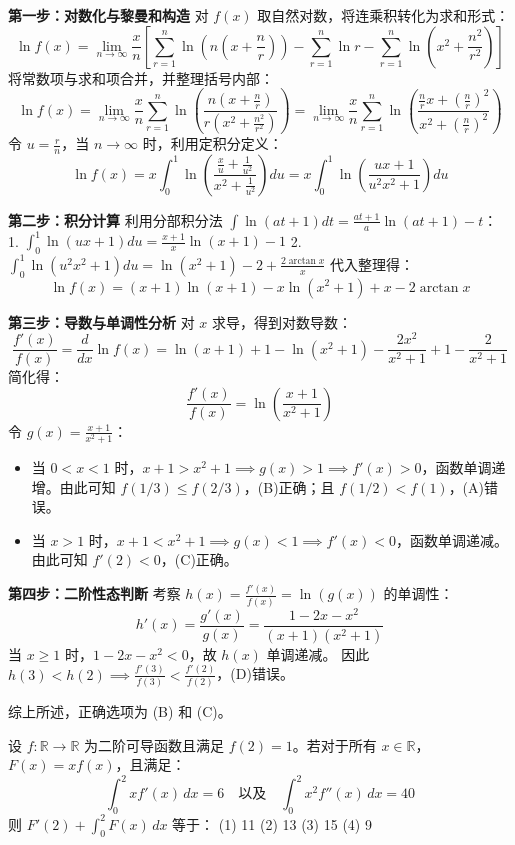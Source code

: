 \begin{questions}
\begin{solution}
\textbf{第一步：对数化与黎曼和构造}
对 $f(x)$ 取自然对数，将连乘积转化为求和形式：
\[ \ln f(x) = \lim_{n \to \infty} \frac{x}{n} \left[ \sum_{r=1}^{n} \ln\left(n\left(x+\frac{n}{r}\right)\right) - \sum_{r=1}^{n} \ln r - \sum_{r=1}^{n} \ln\left(x^2+\frac{n^2}{r^2}\right) \right] \]
将常数项与求和项合并，并整理括号内部：
\[ \ln f(x) = \lim_{n \to \infty} \frac{x}{n} \sum_{r=1}^{n} \ln \left( \frac{n(x + \frac{n}{r})}{r(x^2 + \frac{n^2}{r^2})} \right) = \lim_{n \to \infty} \frac{x}{n} \sum_{r=1}^{n} \ln \left( \frac{\frac{n}{r}x + (\frac{n}{r})^2}{x^2 + (\frac{n}{r})^2} \right) \]
令 $u = \frac{r}{n}$，当 $n \to \infty$ 时，利用定积分定义：
\[ \ln f(x) = x \int_{0}^{1} \ln \left( \frac{\frac{x}{u} + \frac{1}{u^2}}{x^2 + \frac{1}{u^2}} \right) du = x \int_{0}^{1} \ln \left( \frac{ux+1}{u^2x^2+1} \right) du \]

\textbf{第二步：积分计算}
利用分部积分法 $\int \ln(at+1)dt = \frac{at+1}{a}\ln(at+1) - t$：
1. $\int_{0}^{1} \ln(ux+1) du = \frac{x+1}{x}\ln(x+1) - 1$
2. $\int_{0}^{1} \ln(u^2x^2+1) du = \ln(x^2+1) - 2 + \frac{2\arctan x}{x}$
代入整理得：
\[ \ln f(x) = (x+1)\ln(x+1) - x\ln(x^2+1) + x - 2\arctan x \]

\textbf{第三步：导数与单调性分析}
对 $x$ 求导，得到对数导数：
\[ \frac{f'(x)}{f(x)} = \frac{d}{dx} \ln f(x) = \ln(x+1) + 1 - \ln(x^2+1) - \frac{2x^2}{x^2+1} + 1 - \frac{2}{x^2+1} \]
简化得：
\[ \frac{f'(x)}{f(x)} = \ln\left(\frac{x+1}{x^2+1}\right) \]
令 $g(x) = \frac{x+1}{x^2+1}$：
\begin{itemize}
    \item 当 $0 < x < 1$ 时，$x+1 > x^2+1 \implies g(x) > 1 \implies f'(x) > 0$，函数单调递增。由此可知 $f(1/3) \leq f(2/3)$，(B)正确；且 $f(1/2) < f(1)$，(A)错误。
    \item 当 $x > 1$ 时，$x+1 < x^2+1 \implies g(x) < 1 \implies f'(x) < 0$，函数单调递减。由此可知 $f'(2) < 0$，(C)正确。
\end{itemize}

\textbf{第四步：二阶性态判断}
考察 $h(x) = \frac{f'(x)}{f(x)} = \ln(g(x))$ 的单调性：
\[ h'(x) = \frac{g'(x)}{g(x)} = \frac{1-2x-x^2}{(x+1)(x^2+1)} \]
当 $x \geq 1$ 时，$1-2x-x^2 < 0$，故 $h(x)$ 单调递减。
因此 $h(3) < h(2) \implies \frac{f'(3)}{f(3)} < \frac{f'(2)}{f(2)}$，(D)错误。

综上所述，正确选项为 (B) 和 (C)。
\end{solution}

    \question
设 $f : \mathbb{R} \to \mathbb{R}$ 为二阶可导函数且满足 $f(2) = 1$。若对于所有 $x \in \mathbb{R}$，$F(x) = xf(x)$，且满足：
\[ \int_{0}^{2} x f'(x) \,dx = 6 \quad \text{以及} \quad \int_{0}^{2} x^2 f''(x) \,dx = 40 \]
则 $F'(2) + \int_{0}^{2} F(x) \,dx$ 等于：
(1) 11 \quad (2) 13 \quad (3) 15 \quad (4) 9


\end{questions}
